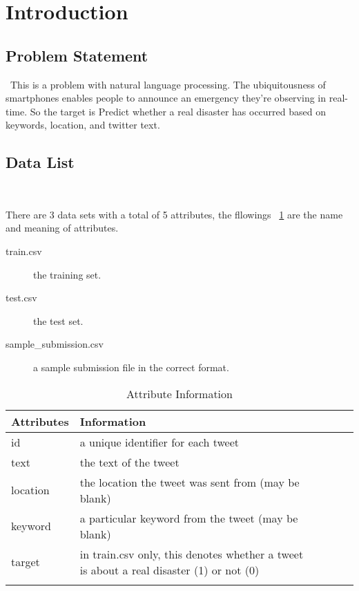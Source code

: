 
\section{Introduction}\label{sec-intro}

\subsection{Problem Statement}
\
This is a problem with natural language processing.
The ubiquitousness of smartphones enables 
people to announce an emergency they’re 
observing in real-time. So the target is
Predict whether a real disaster has occurred 
based on keywords, location, and twitter text.

\subsection{Data List}
\

There are 3 data sets with a total of 5 attributes,
the fllowings ~\cref{tbl:Attribute Information} are the  
name and meaning of attributes.


\begin{description}
	\item[train.csv] the training set.
	\item[test.csv] the test set.
	\item[sample\_submission.csv] a sample submission file in the correct format.
\end{description}

\begin{table}[htbp]
	\label{tbl:Attribute Information}
	\centering
	\caption{Attribute Information}
	\begin{tabular}{llllll}
		\hline
		Attributes & Information                                                                            \\
		\hline
		id   & a unique identifier for each tweet                                                               \\
		text    & the text of the tweet                                                                         \\
		location     & the location the tweet was sent from (may be blank)                                      \\
		keyword     & a particular keyword from the tweet (may be blank)                                        \\
		target    &  in train.csv only, this denotes whether a tweet is about a real disaster (1) or not (0)    \\                                               \\
		\hline
	\end{tabular}
\end{table}

